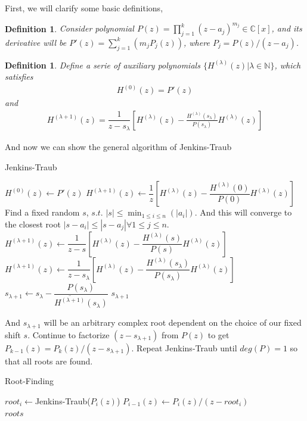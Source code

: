 \documentclass[11pt]{article}
\newtheorem{definition}[theorem]{Definition}
\begin{document}
First, we will clarify some basic definitions,
\begin{definition}
	Consider polynomial $P(z)=\prod_{j=1}^{k}(z-a_j)^{m_j}\in\mathbb{C}[x]$, and its derivative will be $P'(z)=\sum_{j=1}^{k}(m_jP_j(z))$, where $P_j=P(z)/(z-a_j)$.
\end{definition}
\begin{definition}
	Define a serie of auxiliary polynomials $\{H^{(\lambda)}(z)|\lambda\in\mathbb{N}\}$, which satisfies
	\begin{align*}
		H^{(0)}(z)=P'(z)
	\end{align*}
	and
	\begin{align*}
		H^{(\lambda+1)}(z)=\dfrac{1}{z-s_\lambda}[H^{(\lambda)}(z)-\frac{H^{(\lambda)}(s_\lambda)}{P(s_\lambda)}H^{(\lambda)}(z)]
	\end{align*}
\end{definition}
And now we can show the general algorithm of Jenkins-Traub
\begin{algorithm}[H]
	\caption{Jenkins-Traub}
	\begin{algorithmic}[1]
			\State $H^{(0)}(z)\leftarrow P'(z)$
			 
			\State $H^{(\lambda+1)}(z)\leftarrow\dfrac{1}{z}[H^{(\lambda)}(z)-\dfrac{H^{(\lambda)}(0)}{P(0)}H^{(\lambda)}(z)]$
			\EndFor
		\EndProcedure
		\State Find a fixed random $s$, $s.t.$ $|s|\le\min_{1\le i\le n}(|a_i|)$.
		\State And this will converge to the closest root $|s-a_i|\le|s-a_j| \forall 1\le j\le n$.
		  
		\State $H^{(\lambda+1)}(z)\leftarrow \dfrac{1}{z-s}[H^{(\lambda)}(z)-\dfrac{H^{(\lambda)}(s)}{P(s)}H^{(\lambda)}(z)]$
		\EndFor
		\EndProcedure
		\Repeat
		\State $H^{(\lambda+1)}(z)\leftarrow \dfrac{1}{z-s_\lambda}[H^{(\lambda)}(z)-\dfrac{H^{(\lambda)}(s_\lambda)}{P(s_\lambda)}H^{(\lambda)}(z)]$
		\State $s_{\lambda+1}\leftarrow s_\lambda-\dfrac{P(s_\lambda)}{\overline{H^{(\lambda+1)}}(s_\lambda)}$
		\EndProcedure
	\Return $s_{\lambda+1}$
	\end{algorithmic}
\end{algorithm}

And $s_{\lambda+1}$ will be an arbitrary complex root dependent on the choice of our fixed shift $s$. Continue to factorize $(z-s_{\lambda+1})$ from $P(z)$ to get $P_{k-1}(z)=P_{k}(z)/(z-s_{\lambda+1})$. Repeat Jenkins-Traub until $deg(P)=1$ so that all roots are found. 
\begin{algorithm}[H]
	\caption{Root-Finding}
	\begin{algorithmic}[1]
		\Repeat
		\State $root_i\leftarrow$Jenkins-Traub($P_{i}(z)$)
		\State $P_{i-1}(z)\leftarrow P_{i}(z)/(z-root_i)$
		\\
	\Return $roots$
	\end{algorithmic}
\end{algorithm}
\end{document}
